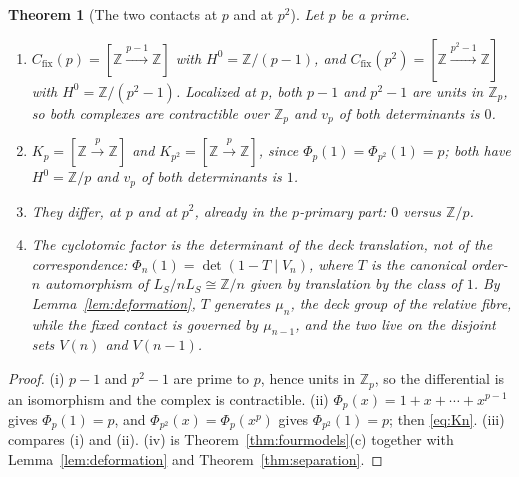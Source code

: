 \documentclass[11pt]{amsart}
\newtheorem{theorem}{Theorem}[section]
\theoremstyle{definition}
\theoremstyle{remark}
\newcommand{\Z}{\mathbb Z}
\begin{document}
\begin{theorem}[The two contacts at $p$ and at $p^2$]\label{thm:discriminating}
Let $p$ be a prime.
\begin{enumerate}
\item[(i)] $C_{\mathrm{fix}}(p)=[\Z\xrightarrow{p-1}\Z]$ with
$H^0=\Z/(p-1)$, and $C_{\mathrm{fix}}(p^2)=[\Z\xrightarrow{p^2-1}\Z]$ with
$H^0=\Z/(p^2-1)$. Localized at $p$, both $p-1$ and $p^2-1$ are units in
$\Z_p$, so both complexes are contractible over $\Z_p$ and $v_p$ of both
determinants is $0$.
\item[(ii)] $K_p=[\Z\xrightarrow{p}\Z]$ and $K_{p^2}=[\Z\xrightarrow{p}\Z]$,
since $\Phi_p(1)=\Phi_{p^2}(1)=p$; both have $H^0=\Z/p$ and $v_p$ of both
determinants is $1$.
\item[(iii)] They differ, at $p$ and at $p^2$, already in the $p$-primary part:
$0$ versus $\Z/p$.
\item[(iv)] The cyclotomic factor is the determinant of the deck translation,
not of the correspondence: $\Phi_n(1)=\det(1-T\mid V_n)$, where $T$ is the
canonical order-$n$ automorphism of $L_S/nL_S\cong\Z/n$ given by translation by
the class of $1$. By Lemma~\ref{lem:deformation}, $T$ generates $\mu_n$, the
deck group of the relative fibre, while the fixed contact is governed by
$\mu_{n-1}$, and the two live on the disjoint sets $V(n)$ and $V(n-1)$.
\end{enumerate}
\end{theorem}

\begin{proof}
(i) $p-1$ and $p^2-1$ are prime to $p$, hence units in $\Z_p$, so the
differential is an isomorphism and the complex is contractible. (ii)
$\Phi_p(x)=1+x+\cdots+x^{p-1}$ gives $\Phi_p(1)=p$, and
$\Phi_{p^2}(x)=\Phi_p(x^p)$ gives $\Phi_{p^2}(1)=p$; then \eqref{eq:Kn}. (iii)
compares (i) and (ii). (iv) is Theorem~\ref{thm:fourmodels}(c) together with
Lemma~\ref{lem:deformation} and Theorem~\ref{thm:separation}.
\end{proof}
\end{document}
